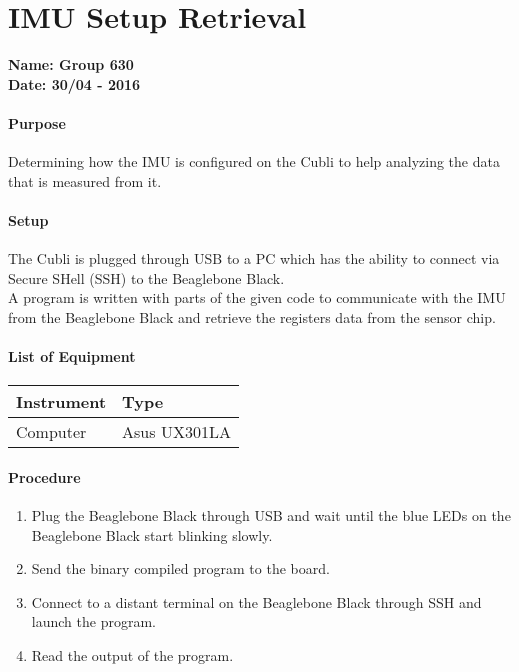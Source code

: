 \chapter{IMU Setup Retrieval} \label{app:IMUSetupRetrieval}
\textbf{Name: Group 630}\\
\textbf{Date: 30/04 - 2016}

\subsubsection{Purpose}
Determining how the IMU is configured on the Cubli to help analyzing the data that is measured from it.

\subsubsection{Setup}
The Cubli is plugged through USB to a PC which has the ability to connect via Secure SHell (SSH) to the Beaglebone Black.\\
A program is written with parts of the given code to communicate with the IMU from the Beaglebone Black and retrieve the registers data from the sensor chip.
                                                     
\subsubsection{List of Equipment}
\begin{table}[H]
\begin{tabular}{|p{10cm}|p{4cm}|}
\hline%
  \textbf{Instrument}                &  \textbf{Type} \\
\hline%
  Computer                           &  Asus UX301LA  \\
\hline%
\end{tabular}
\end{table}

\subsubsection{Procedure}

\begin{enumerate}
  \item Plug the Beaglebone Black through USB and wait until the blue LEDs on the Beaglebone Black start blinking slowly.
  \item Send the binary compiled program to the board.
  \item Connect to a distant terminal on the Beaglebone Black through SSH and launch the program.
  \item Read the output of the program.
\end{enumerate}
